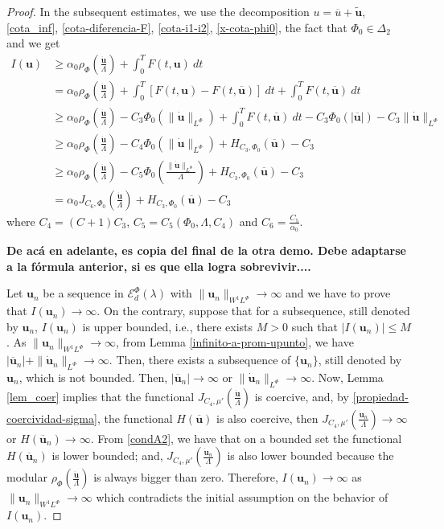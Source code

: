 \documentclass[twoside]{article}
\theoremstyle{remark}
\newcommand{\orlnor}{\|_{L^{\Phi}}}
\newcommand{\lphi}{L^{\Phi}}
\newcommand{\sobnor}{\|_{W^{1}\lphi}}
\newcommand{\domi}{\mathcal{E}^{\Phi}_d(\lambda)}
\renewcommand{\b}[1]{\boldsymbol{#1}}
\renewcommand{\leq}{\leqslant}
\begin{document}
\begin{proof}
In the subsequent estimates, we use the decomposition $u=\overline{u}+\b{\tilde{u}}$, \eqref{cota_inf}, \eqref{cota-diferencia-F},
\eqref{cota-i1-i2}, \eqref{x-cota-phi0}, the fact that $\Phi_0 \in \Delta_2$ and we get
\begin{equation}\label{cota_inf_I}
\begin{split}
I(\b{u})&\geq\alpha_0\rho_{\Phi}\left( \frac{\b{\dot{u}}}{\Lambda}\right)+\int_0^TF(t,\b{u})\ dt
\\ 
&=\alpha_0\rho_{\Phi}\left( \frac{\b{\dot{u}}}{\Lambda}\right)+ \int_0^T \left[F(t,\b{u})-F(t,\b{\overline{u}})\right]\ dt 
+  \int_0^TF(t,\b{\overline{u}})\ dt
\\
&\geq \alpha_0\rho_{\Phi}\left( \frac{\b{\dot{u}}}{\Lambda}\right)
-C_3 \Phi_0(\|\b{\dot u}\orlnor)
+\int_0^TF(t,\b{\overline{u}})\ dt-
C_3 \Phi_0(|\b{\overline{u}}|)-
C_3 \|\b{\dot{u}}\orlnor
\\
&\geq
\alpha_0\rho_{\Phi}\left( \frac{\b{\dot{u}}}{\Lambda}\right)
-C_4 \Phi_0(\|\b{\dot u}\orlnor)
+H_{C_3, \Phi_0}(\b{\overline{u}})
-C_3 
\\&\geq
\alpha_0\rho_{\Phi}\left( \frac{\b{\dot{u}}}{\Lambda}\right)
-C_5 \Phi_0\left(\frac{\|\b{\dot u}\orlnor}{\Lambda} \right)
+H_{C_3, \Phi_0}(\b{\overline{u}})
-C_3 
\\&=
\alpha_0J_{C_6,\Phi_0}\left(\frac{\b{\dot u}}{\Lambda}\right)
+H_{C_3, \Phi_0}(\b{\overline{u}})
-C_3 
\end{split}
\end{equation}
where  $C_4=(C+1)C_3$, $C_5=C_5(\Phi_0,\Lambda,C_4)$ and $C_6=\frac{C_5}{\alpha_0}$.



{\bf De ac\'a en adelante, es copia del  final de la otra demo. Debe adaptarse a la f\'ormula anterior, si es que ella logra sobrevivir....}  

Let $\b{u}_n$ be  a sequence in $\domi$ with 
$\|\b{u}_n\sobnor\to\infty$ and we have to prove that $I(\b{u}_n)\to\infty$. 
On the contrary, suppose  that for a subsequence, 
still denoted by $\b{u}_n$, $I(\b{u}_n)$ is upper bounded, i.e., there exists $M>0$ such that $|I(\b{u}_{n})|\leq M$. 
As $\|\b{u}_n\sobnor\to\infty$, from Lemma \ref{infinito-a-prom-upunto},  we have $|\overline{\b{u}}_n|+\|\b{\dot{u}}_n\orlnor\to \infty$.
Then, there exists a subsequence of $\{\b{u}_n\}$, still denoted by $\b{u}_n$, which is not bounded.
Then, 
$|\b{\overline u}_n|\to \infty$ or $\|\b{\dot{u}}_n\orlnor\to \infty$.
Now, Lemma \ref{lem_coer} implies that the functional $J_{C_4,\mu'}(\frac{\b{\dot u}}{\Lambda})$ is coercive,
and, by \eqref{propiedad-coercividad-sigma},
the functional $H(\b{\overline{u}})$ is also coercive, then 
$J_{C_4,\mu'}(\frac{\b{\dot u}_n}{\Lambda}) \to \infty$ or $H(\b{\overline{u}}_n)\to \infty$.
From \eqref{condA2}, we have that on a bounded set the functional $H(\b{\overline{u}}_n)$ is lower bounded; and, $J_{C_4,\mu'}(\frac{\b{\dot u}_n}{\Lambda})$ is also lower bounded  because the modular $\rho_{\Phi}\left(\frac{\b{\dot u}}{\Lambda}\right)$ is always bigger than zero. 
Therefore,  $I(\b{u}_n)\to\infty$ as $\|\b{u}_n\sobnor\to\infty$ which contradicts the initial assumption on the behavior of $I(\b{u}_n)$. 
\end{proof}
\end{document}
